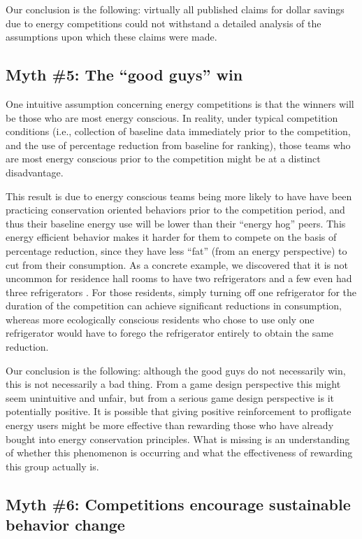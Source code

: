 \documentclass[jou]{apa} %
\begin{document}
Our conclusion is the following: virtually all published claims for dollar savings due to
energy competitions could not withstand a detailed analysis of the assumptions upon which
these claims were made.  

\subsection{Myth \#5: The ``good guys'' win}

One intuitive assumption concerning energy competitions is that the winners will be those
who are most energy conscious.  In reality, under typical competition conditions
(i.e., collection of baseline data immediately prior to the competition, and the use of
percentage reduction from baseline for ranking), those teams who are most energy conscious
prior to the competition might be at a distinct disadvantage.

This result is due to energy conscious teams being more likely to have have
been practicing conservation oriented behaviors prior to the competition
period, and thus their baseline energy use will be lower than their ``energy
hog'' peers. This energy efficient behavior makes it harder for them to compete
on the basis of percentage reduction, since they have less ``fat'' (from an
energy perspective) to cut from their consumption.  As a concrete example, we
discovered that it is not uncommon for residence hall rooms to have two
refrigerators and a few even had three refrigerators \cite{csdl2-11-12}. For
those residents, simply turning off one refrigerator for the duration of the
competition can achieve significant reductions in consumption, whereas more
ecologically conscious residents who chose to use only one refrigerator would
have to forego the refrigerator entirely to obtain the same reduction.

Our conclusion is the following: although the good guys do not necessarily win, this is
not necessarily a bad thing. From a game design perspective this might seem unintuitive
and unfair, but from a serious game design perspective is it potentially positive. It is
possible that giving positive reinforcement to profligate energy users might be more effective
than rewarding those who have already bought into energy conservation principles. What is
missing is an understanding of whether this phenomenon is occurring and what the
effectiveness of rewarding this group actually is.

\subsection{Myth \#6: Competitions encourage sustainable behavior change}
\end{document}
